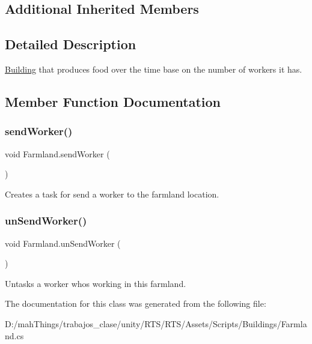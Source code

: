 \subsection*{Additional Inherited Members}


\subsection{Detailed Description}
\mbox{\hyperlink{class_building}{Building}} that produces food over the time base on the number of workers it has. 



\subsection{Member Function Documentation}
\mbox{\label{class_farmland_a80ea2b37e60fa6d717df66597e38b48e}} 
\subsubsection{\texorpdfstring{send\+Worker()}{sendWorker()}}
{\footnotesize\ttfamily void Farmland.\+send\+Worker (\begin{DoxyParamCaption}{ }\end{DoxyParamCaption})}



Creates a task for send a worker to the farmland location. 

\mbox{\label{class_farmland_a30433b1416b8d632c99b60e302342530}} 
\subsubsection{\texorpdfstring{un\+Send\+Worker()}{unSendWorker()}}
{\footnotesize\ttfamily void Farmland.\+un\+Send\+Worker (\begin{DoxyParamCaption}{ }\end{DoxyParamCaption})}



Untasks a worker whos working in this farmland. 



The documentation for this class was generated from the following file\+:\begin{DoxyCompactItemize}
\item 
D\+:/mah\+Things/trabajos\+\_\+clase/unity/\+R\+T\+S/\+R\+T\+S/\+Assets/\+Scripts/\+Buildings/Farmland.\+cs\end{DoxyCompactItemize}
